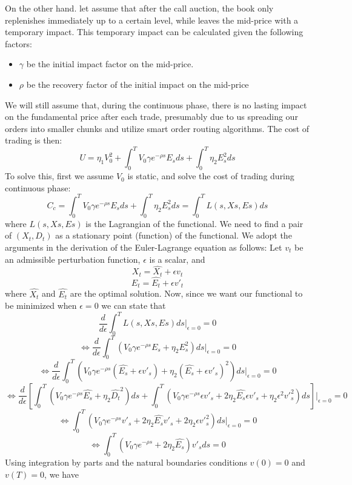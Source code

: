 \documentclass{article}
\begin{document}
On the other hand. let assume that after the call auction, the book only replenishes immediately up to a certain level, while leaves the mid-price with a temporary impact. This temporary impact can be calculated given the following factors:
\begin{itemize}
  \item $\gamma$ be the initial impact factor on the mid-price.
  \item $\rho$ be the recovery factor of the initial impact on the mid-price
\end{itemize}
We will still assume that, during the continuous phase, there is no lasting impact on the fundamental price after each trade, presumably due to us spreading our orders into smaller chunks and utilize smart order routing algorithms. The cost of trading is then:
\[
  U = \eta_1 V_0^2  + \int_0^T V_0 \gamma e^{-\rho s} E_s ds + \int_0^T \eta_2 E_s^2 ds
\]
To solve this, first we assume $V_0$ is static, and solve the cost of trading during continuous phase:
\[
  C_c = \int_0^T V_0 \gamma e^{-\rho s} E_s ds + \int_0^T \eta_2 E_s^2 ds = \int_0^T L(s, Xs, Es) ds
\]
where $ L(s, Xs, Es)$ is the Lagrangian of the functional. We need to find a pair of $(X_t, D_t)$ as a stationary point (function) of the functional. We adopt the arguments in the derivation of the Euler-Lagrange equation as follows:
Let $v_t$ be an admissible perturbation function, $\epsilon$ is a scalar, and
\[
  X_t = \hat{X_t} + \epsilon v_t
\]
\[
  E_t = \hat{E_t} + \epsilon {v'}_t
\]
where $\hat{X_t}$ and $\hat{E_t}$ are the optimal solution. Now, since we want our functional to be minimized when $\epsilon=0$ we can state that
\[
  \frac{d}{d\epsilon} \int_0^T L(s, Xs, Es) ds|_{\epsilon=0}=0
\]
\[
  \Leftrightarrow \frac{d}{d\epsilon} \int_0^T (V_0 \gamma e^{-\rho s} E_s + \eta_2 E_s^2) ds|_{\epsilon=0}=0
\]
\[
  \Leftrightarrow \frac{d}{d\epsilon} \int_0^T (V_0 \gamma e^{-\rho s} (\hat{E_s} + \epsilon {v'}_s) + \eta_2 (\hat{E_s} + \epsilon {v'}_s)^2) ds|_{\epsilon=0}=0
\]
\[
  \Leftrightarrow \frac{d}{d\epsilon} \left[\int_0^T (V_0 \gamma e^{-\rho s} \hat{E_s} + \eta_2 \hat{D_t}^2 ) ds  + \int_0^T (V_0 \gamma e^{-\rho s}\epsilon {v'}_s + 2\eta_2\hat{E_s}\epsilon{v'}_s + \eta_2\epsilon^2{v'}^2_s)ds\right]|_{\epsilon=0}=0
\]
\[
  \Leftrightarrow \int_0^T (V_0 \gamma e^{-\rho s} {v'}_s + 2\eta_2\hat{E_s}{v'}_s + 2\eta_2\epsilon{v'}^2_s)ds|_{\epsilon=0} = 0
\]
\[
  \Leftrightarrow \int_0^T (V_0 \gamma e^{-\rho s}  + 2\eta_2\hat{E_s}) {v'}_s ds = 0
\]
Using integration by parts and the natural boundaries conditions $v(0)=0$ and $v(T)=0$, we have
\end{document}
